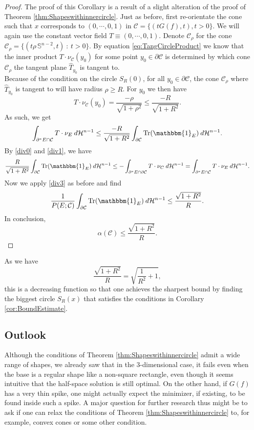 \documentclass[artcle, 11pt, reqno]{amsart}
\numberwithin{equation}{section}
\newcommand{\Hd}{\mathcal{H}}
\newcommand{\ind}{\mathbbm{1}}
\newcommand{\C}{\mathcal{C}}
\newcommand{\dd}{\: d}
\DeclareMathOperator{\Tr}{Tr}
\theoremstyle{plain}
\theoremstyle{definition}
\theoremstyle{remark}
\begin{document}
	\begin{proof}
		The proof of this Corollary is a result of a slight alteration of the proof of Theorem \ref{thm:Shapeswithinnercircle}. Just as before, first re-orientate the cone such that $x$ corresponds to $(0,\cdots,0,1)$ in $\C = \{ (tG(f),t), t>0 \}$. 
		We will again use the constant vector field $T \equiv (0,\cdots,0,1)$. Denote $\C_\rho$ for the cone $\C_\rho = \{(t \rho \, \mathbb{S}^{n-2},t) \: : \: t>0 \} $.
		By equation \eqref{eq:TangCircleProduct} we know that the inner product $T \cdot \nu_\C(y_0)$ for some point $y_0 \in \partial \C$ is determined by which cone $\C_\rho$ the tangent plane $\hat{T}_{y_0}$ is tangent to. \\
		Because of the condition on the circle $S_R(0)$, for all $y_0 \in \partial \C$, the cone $\C_\rho$ where $\hat{T}_{y_0}$ is tangent to will have radius $\rho \geq R$. For $y_0$ we then have
		\[
		T \cdot \nu_\C(y_0) = \frac{-\rho}{\sqrt{1+\rho^2}} \leq \frac{-R}{\sqrt{1+R^2}}.
		\]
		As such, we get
		\[
		\int_{\partial^\ast E \cap \C} T \cdot \nu_E \dd\Hd^{n-1} \leq
		\frac{-R}{\sqrt{1+R^2}} \int_{\partial \C} \Tr(\ind_E) \dd\Hd^{n-1}.
		\]
		By \eqref{div0} and \eqref{div1}, we have
		\[
		\frac{R}{\sqrt{1+R^2}} \int_{\partial \C} \Tr(\ind_E) \dd\Hd^{n-1} 
		\leq
		-\int_{\partial^\ast E \cap \partial \C} T \cdot \nu_C \dd\Hd^{n-1}
		=
		\int_{\partial^\ast E \cap \C} T\cdot \nu_E \dd\Hd^{n-1}.
		\]
		Now we apply \eqref{div3} as before and find 
		\[
		\frac{1}{P(E;\C)}\int_{\partial \C} \Tr(\ind_E) \dd\Hd^{n-1} \leq \frac{\sqrt{1+R^2}}{R}.
		\]
		In conclusion,
		\[
		\alpha(\C) \leq \frac{\sqrt{1+R^2}}{R}.
		\]
	\end{proof}
	As we have
	\[\frac{\sqrt{1+R^2}}{R} = \sqrt{\frac{1}{R^2}+1},\]
	this is a decreasing function so that one achieves the sharpest bound by finding the biggest circle $S_R(x)$ that satisfies the conditions in Corollary \ref{cor:BoundEstimate}.
	
	\vspace{5mm}
	
	\subsection{Outlook}
	Although the conditions of Theorem \ref{thm:Shapeswithinnercircle} admit a wide range of shapes, we already saw that in the 3-dimensional case, it fails even when the base is a regular shape like a non-square rectangle, even though it seems intuitive that the half-space solution is still optimal. On the other hand, if $G(f)$ has a very thin spike, one might actually expect the minimizer, if existing, to be found inside such a spike. A major question for further research thus might be to ask if one can relax the conditions of Theorem \ref{thm:Shapeswithinnercircle} to, for example, convex cones or some other condition. 
	
\end{document}
